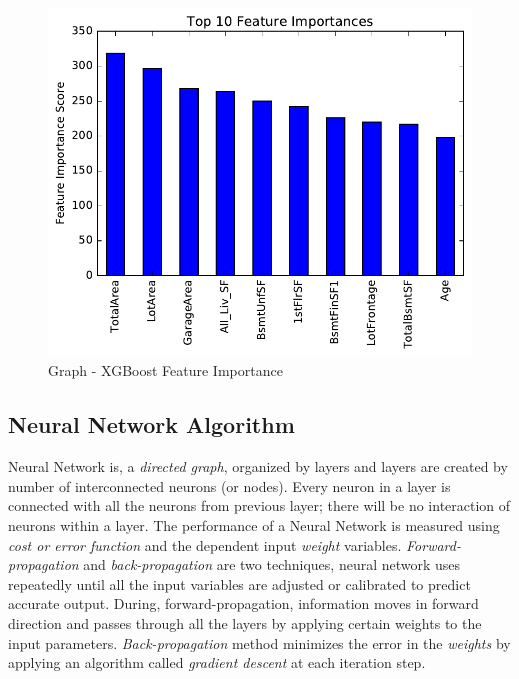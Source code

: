 \documentclass[sigconf]{acmart}
\begin{document}
\begin{figure}[htb]
	\centering
	\includegraphics[width=1.0\columnwidth]{images/xgboost_feature_importance2}	
	\caption{Graph - XGBoost Feature Importance} \label{fig:xgb-feature-imp} 
\end{figure}
	
	\subsection{Neural Network Algorithm}
	Neural Network is, a {\em directed graph}, organized by layers and layers are created by number of interconnected neurons (or nodes). Every neuron in a layer is connected with all the neurons from previous layer; there will be no interaction of neurons within a layer. The performance of a Neural Network is measured using {\em cost or error function} and the dependent input {\em weight} variables. {\em Forward-propagation} and {\em back-propagation} are two techniques, neural network uses repeatedly until all the input variables are adjusted or calibrated to predict accurate output. During, forward-propagation, information moves in forward direction and passes through all the layers by applying certain weights to the input parameters. {\em Back-propagation} method minimizes the error in the {\em weights} by applying an algorithm called {\em gradient descent} at each iteration step. 
	
\end{document}
